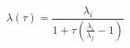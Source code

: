 \documentclass[12pt]{article}
\begin{document}
$$
  \lambda(\tau) = \frac{\lambda_i}{1 + \tau \left( \frac{\lambda_i}{\lambda_f} - 1 \right)}
$$
\end{document}
